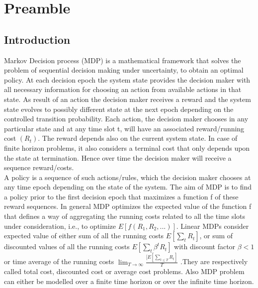 \documentclass[10pt,a4paper,oneside]{report}
\begin{document}
\chapter{Preamble}
\section{Introduction}
Markov Decision process (MDP) is a mathematical framework that solves the problem of sequential decision making under uncertainty, to obtain an optimal policy. At each decision epoch the system state provides the decision maker with all necessary information for choosing an action from available actions in that state. As result of an action the decision maker receives a reward and the system state evolves to possibly different state at the next epoch depending on the controlled transition probability. Each action, the decision maker chooses in any particular state and at any time slot t, will have an associated reward/running cost $(R_t)$. The reward depends also on the current system state. In case of finite horizon problems, it also considers a terminal cost that only depends upon the state at termination. Hence over time the decision maker will receive a sequence reward/costs.\\

\noindent A policy is a sequence of such actions/rules, which the decision maker chooses at any time epoch depending on the state of the system. The aim of MDP is to find a policy prior to the first decision epoch that maximizes a function f of these reward sequences. In general MDP optimizes the expected value of the function f that defines a way of aggregating the running costs related to all the time slots under consideration, i.e., to optimize $E[f(R_1,R_2,...)]$. Linear MDPs consider expected value of either sum of all the running costs $E[\sum_t{R_t} ]$, or sum of discounted values of all the running costs $E[\sum_t{\beta^t {R_t}} ]$ with discount factor $\beta<1$ or time average of the running costs $\displaystyle\lim_{T \to \infty}\frac{[E[\sum_{t\leq T}{R_t}]}{T}$ .They are respectively called total cost, discounted cost or average cost problems. Also MDP problem can either be modelled over a finite time horizon or over the infinite time horizon. \\
\end{document}
